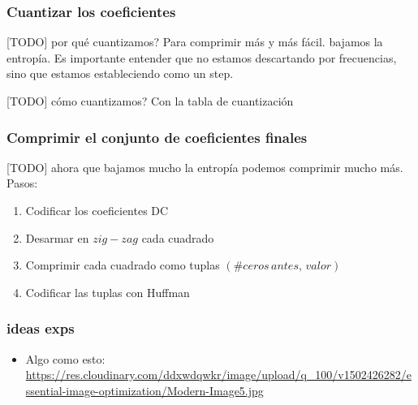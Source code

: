\documentclass{beamer}
\begin{document}
\begin{frame}
    \frametitle{Cuantizar los coeficientes}
    [TODO] por qué cuantizamos? Para comprimir más y más fácil. bajamos la entropía.
    Es importante entender que no estamos descartando por frecuencias, sino
    que estamos estableciendo como un step.

    [TODO] cómo cuantizamos? Con la tabla de cuantización
\end{frame}

\begin{frame}
    \frametitle{Comprimir el conjunto de coeficientes finales}

    [TODO] ahora que bajamos mucho la entropía podemos comprimir mucho más. Pasos:
    \begin{enumerate}
        \item Codificar los coeficientes DC
        \item Desarmar en $zig-zag$ cada cuadrado
        \item Comprimir cada cuadrado como tuplas $(\# ceros \, antes, \, valor)$
        \item Codificar las tuplas con Huffman

    \end{enumerate}
\end{frame}
\begin{frame}
    \frametitle{ideas exps}
    \begin{itemize}
        \item Algo como esto: 
            \url{https://res.cloudinary.com/ddxwdqwkr/image/upload/q_100/v1502426282/essential-image-optimization/Modern-Image5.jpg}
    \end{itemize}
    
\end{frame}
\end{document}
